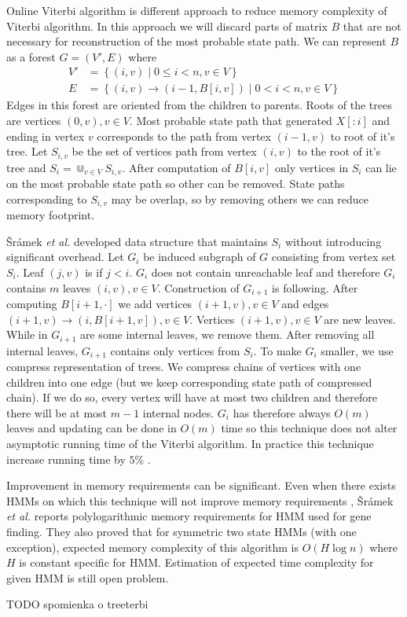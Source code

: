 Online Viterbi algorithm is different approach to reduce memory complexity of
Viterbi algorithm. In this approach we will discard parts of matrix $B$ that 
are not necessary for reconstruction of the most probable state path.
We can represent $B$ as a forest $G=(V',E)$ where
\begin{align*}
V' &= \left\{ (i,v)\mid 0\leq i< n, v\in V  \right\}\\
E &= \left\{ (i,v)\to (i-1,B[i,v])\mid 0<i<n,v\in V\right\}
\end{align*}
Edges in this forest are oriented from the children to parents. Roots of the
trees are vertices $(0,v),v\in V$.  Most probable state path that generated
$X[:i]$ and ending in vertex $v$ corresponds to the path from vertex $(i-1,v)$
to root of it's tree. Let $S_{i,v}$ be the set of vertices path from vertex
$(i,v)$ to the root of it's tree and $S_i=\Cup_{v\in V}S_{i,v}$.
After computation of $B[i,v]$ only vertices in $S_i$ can lie on the most
probable state path so other can be removed. State paths corresponding to
$S_{i,v}$ may be overlap, so by removing others we can reduce memory
footprint.

{\v S}r{\'a}mek {\it et al.} developed data structure that maintains $S_i$
without introducing significant overhead.  Let $G_i$ be induced subgraph of $G$
consisting from vertex set $S_i$. Leaf $(j,v)$ is  if
$j<i$.  $G_i$ does not contain unreachable leaf and therefore $G_i$ contains $m$
leaves $(i,v),v\in V$. Construction of $G_{i+1}$ is following.
After computing $B[i+1,\cdot]$ we add vertices $(i+1,v),v\in V$ and edges 
$(i+1,v)\to (i,B[i+1,v]),v\in V$. Vertices $(i+1,v),v\in V$ are new leaves.
While in $G_{i+1}$ are some internal leaves, we remove them.
After removing all internal leaves, $G_{i+1}$ contains only vertices from $S_i$.
To make $G_i$ smaller, we use compress representation of trees. We compress
chains of vertices with one children into one edge (but we keep
corresponding state path of compressed chain). If we do so, every vertex will
have at most two children and therefore there will be at most $m-1$ internal
nodes. $G_i$ has therefore always $O(m)$ leaves and updating can be done in
$O(m)$ time so this technique does not alter asymptotic running time of the
Viterbi algorithm. In practice this technique increase running time by $5$\%
\cite{Sramek2007}.

Improvement in memory requirements can be significant. Even when there exists
HMMs on which this technique will not improve memory requirements
\cite{Sramek2007}, {\v S}r{\'a}mek {\it et al.} reports polylogarithmic 
memory requirements for HMM used for gene finding.
They also proved that for symmetric two
state HMMs (with one exception), expected memory complexity of this algorithm is
$O(H\log n)$ where $H$ is constant specific for HMM. Estimation of expected time
complexity for given HMM is still open problem.

TODO spomienka o treeterbi
